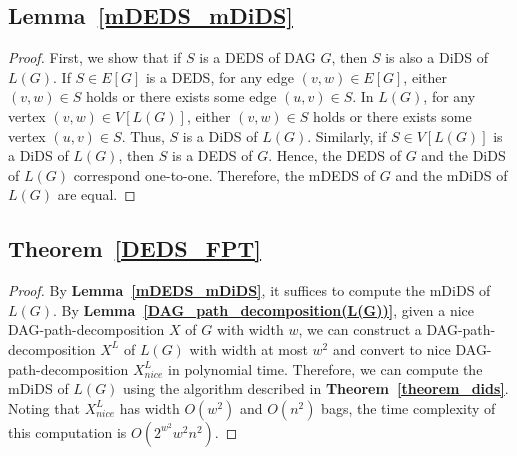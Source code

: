 \documentclass[runningheads]{llncs}
\theoremstyle{plain}
\theoremstyle{definition}
\begin{document}
\subsection{\textbf{Lemma~\ref{mDEDS_mDiDS}}}\label{appendix_B2}
\begin{proof}
    First, we show that if $S$ is a DEDS of DAG $G$, then $S$ is also a DiDS of $L(G)$. If $S\in E[G]$ is a DEDS, for any edge $(v, w) \in E[G]$, either $(v, w) \in S$ holds or there exists some edge $(u, v) \in S$. In $L(G)$, for any vertex $(v, w) \in V[L(G)]$, either $(v, w) \in S$ holds or there exists some vertex $(u, v) \in S$. Thus, $S$ is a DiDS of $L(G)$. Similarly, if $S \in V[L(G)]$ is a DiDS of $L(G)$, then $S$ is a DEDS of $G$. Hence, the DEDS of $G$ and the DiDS of $L(G)$ correspond one-to-one. Therefore, the mDEDS of $G$ and the mDiDS of $L(G)$ are equal.
\end{proof}


\subsection{\textbf{Theorem~\ref{DEDS_FPT}}}\label{appendix_B3}
\begin{proof}
    By \textbf{Lemma~\ref{mDEDS_mDiDS}}, it suffices to compute the mDiDS of $L(G)$. By \textbf{Lemma~\ref{DAG_path_decomposition(L(G))}}, given a nice DAG-path-decomposition $X$ of $G$ with width $w$, we can construct a DAG-path-decomposition $X^L$ of $L(G)$ with width at most $w^2$ and convert to nice DAG-path-decomposition $X^L_{nice}$ in polynomial time. Therefore, we can compute the mDiDS of $L(G)$ using the algorithm described in \textbf{Theorem~\ref{theorem_dids}}. Noting that $X^L_{nice}$ has width $O(w^2)$ and $O(n^2)$ bags, the time complexity of this computation is $O(2^{w^2}w^2n^2)$.
\end{proof}
\end{document}
